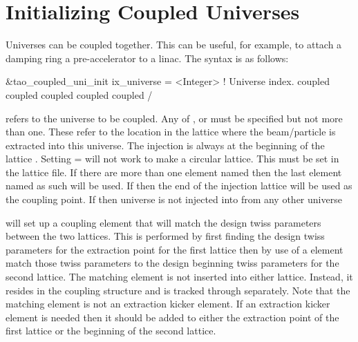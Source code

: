 {%
\section{Initializing Coupled Universes}
\label{s:coupled_uni}

Universes can be coupled together. This can be useful, for example, to attach a
damping ring a pre-accelerator to a linac. The syntax is as follows:
\begin{example}
  &tao_coupled_uni_init
    ix_universe                = <Integer>         ! Universe index.
    coupled%
    coupled%
    coupled%
    coupled%
    coupled%
  /
\end{example}
 refers to the universe to be coupled. Any of
,  or  must be specified but
not more than one. These refer to the location in the lattice where
the beam/particle is extracted into this universe.  The injection is
always at the beginning of the lattice . Setting
 =  will not work to make a circular
lattice. This must be set in the lattice file.  If there are more than
one element named  then the last element named as such
will be used. If  then the end of the injection
lattice will be used as the coupling point. If  then universe  is not injected into from any other universe

 will set up a coupling element that will match
the design twiss parameters between the two lattices. This is
performed by first finding the design twiss parameters for the
extraction point for the first lattice then by use of a \bmad
{} element match those twiss parameters to the design
beginning twiss parameters for the second lattice. The matching
element is not inserted into either lattice. Instead, it resides in
the \tao coupling structure and is tracked through separately. Note
that the matching element is not an extraction kicker element. If an
extraction kicker element is needed then it should be added to either
the extraction point of the first lattice or the beginning of the
second lattice.

}
